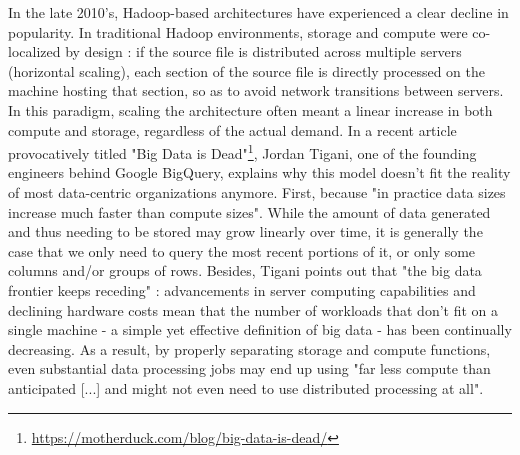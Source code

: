 In the late 2010's, Hadoop-based architectures have experienced a clear decline in popularity. In traditional Hadoop environments, storage and compute were co-localized by design : if the source file is distributed across multiple servers (horizontal scaling), each section of the source file is directly processed on the machine hosting that section, so as to avoid network transitions between servers. In this paradigm, scaling the architecture often meant a linear increase in both compute and storage, regardless of the actual demand. In a recent article provocatively titled "Big Data is Dead"\footnote{\url{https://motherduck.com/blog/big-data-is-dead/}}, Jordan Tigani, one of the founding engineers behind Google BigQuery, explains why this model doesn't fit the reality of most data-centric organizations anymore. First, because "in practice data sizes increase much faster than compute sizes". While the amount of data generated and thus needing to be stored may grow linearly over time, it is generally the case that we only need to query the most recent portions of it, or only some columns and/or groups of rows. Besides, Tigani points out that "the big data frontier keeps receding" : advancements in server computing capabilities and declining hardware costs mean that the number of workloads that don't fit on a single machine - a simple yet effective definition of big data - has been continually decreasing. As a result, by properly separating storage and compute functions, even substantial data processing jobs may end up using "far less compute than anticipated [...] and might not even need to use distributed processing at all".

